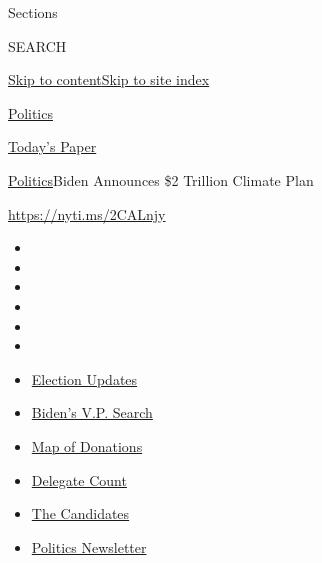 Sections

SEARCH

\protect\hyperlink{site-content}{Skip to
content}\protect\hyperlink{site-index}{Skip to site index}

\href{https://www.nytimes.com/section/politics}{Politics}

\href{https://myaccount.nytimes.com/auth/login?response_type=cookie\&client_id=vi}{}

\href{https://www.nytimes.com/section/todayspaper}{Today's Paper}

\href{/section/politics}{Politics}\textbar{}Biden Announces \$2 Trillion
Climate Plan

\url{https://nyti.ms/2CALnjy}

\begin{itemize}
\item
\item
\item
\item
\item
\item
\end{itemize}

\begin{itemize}
\item
  \href{https://www.nytimes.com/2020/07/31/us/elections/biden-vs-trump.html?action=click\&pgtype=Article\&state=default\&region=TOP_BANNER\&context=storylines_menu}{Election
  Updates}
\item
  \href{https://www.nytimes.com/article/biden-vice-president-2020.html?action=click\&pgtype=Article\&state=default\&region=TOP_BANNER\&context=storylines_menu}{Biden's
  V.P. Search}
\item
  \href{https://www.nytimes.com/interactive/2020/07/24/us/politics/trump-biden-campaign-donors.html?action=click\&pgtype=Article\&state=default\&region=TOP_BANNER\&context=storylines_menu}{Map
  of Donations}
\item
  \href{https://www.nytimes.com/interactive/2020/us/elections/delegate-count-primary-results.html?action=click\&pgtype=Article\&state=default\&region=TOP_BANNER\&context=storylines_menu}{Delegate
  Count}
\item
  \href{https://www.nytimes.com/interactive/2019/us/politics/2020-presidential-candidates.html?action=click\&pgtype=Article\&state=default\&region=TOP_BANNER\&context=storylines_menu}{The
  Candidates}
\item
  \href{https://www.nytimes.com/newsletters/politics?action=click\&pgtype=Article\&state=default\&region=TOP_BANNER\&context=storylines_menu}{Politics
  Newsletter}
\end{itemize}

